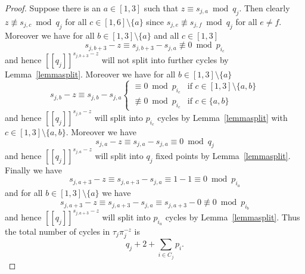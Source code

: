 \documentclass{article}
\newcommand{\llbracket}{[\![}
\newcommand{\rrbracket}{]\!]}
\begin{document}
\begin{proof}
Suppose there is an $a \in [1,3]$ such that $z \equiv s_{j,a} \bmod q_j$. Then clearly $z \not \equiv s_{j,c} \bmod q_j$ for all $c \in [1,6] \setminus \{a\}$ since $s_{j,e} \not \equiv s_{j,f} \bmod q_j$ for all $e \neq f$. Moreover we have for all $b \in [1,3] \setminus \{a\}$ and all $c \in [1,3]$
\begin{displaymath}
s_{j,b+3} - z \equiv s_{j,b+3} - s_{j,a} \not \equiv 0 \bmod p_{i_c}
\end{displaymath}
and hence $\llbracket q_j \rrbracket^{s_{j,b+3}-z}$ will not split into further cycles by Lemma~\ref{lemmasplit}. Moreover we have for all $b \in [1,3] \setminus \{a\}$
\begin{displaymath}
s_{j,b} - z \equiv s_{j,b} - s_{j,a} \begin{cases}
\equiv 0 \bmod p_{i_c} & \text{if } c \in [1,3] \setminus \{a,b\}\\
\not \equiv 0 \bmod p_{i_c} & \text{if } c \in \{a,b\}
\end{cases}
\end{displaymath}
and hence $\llbracket q_j \rrbracket^{s_{j,b}-z}$ will split into $p_{i_c}$ cycles by Lemma~\ref{lemmasplit} with $c \in [1,3] \setminus \{a,b\}$. Moreover we have
\begin{displaymath}
s_{j,a} - z \equiv s_{j,a} - s_{j,a} \equiv 0 \bmod q_j
\end{displaymath}
and hence $\llbracket q_j \rrbracket^{s_{j,a}-z}$ will split into $q_j$ fixed points by Lemma~\ref{lemmasplit}. Finally we have
\begin{displaymath}
s_{j,a+3} - z \equiv s_{j,a+3} - s_{j,a} \equiv 1 - 1 \equiv 0 \bmod p_{i_a}
\end{displaymath}
and for all $b \in [1,3] \setminus \{a\}$ we have
\begin{displaymath}
s_{j,a+3} - z \equiv s_{j,a+3} - s_{j,a} \equiv s_{j,a+3} - 0 \not \equiv 0 \bmod p_{i_b}
\end{displaymath}
and hence $\llbracket q_j \rrbracket^{s_{j,a+3}-z}$ will split into $p_{i_a}$ cycles by Lemma~\ref{lemmasplit}. Thus the total number of cycles in $\tau_j\pi_j^{-z}$ is
\begin{displaymath}
q_j + 2 + \sum_{i \in C_j} p_i.
\end{displaymath}


\end{proof}
\end{document}
